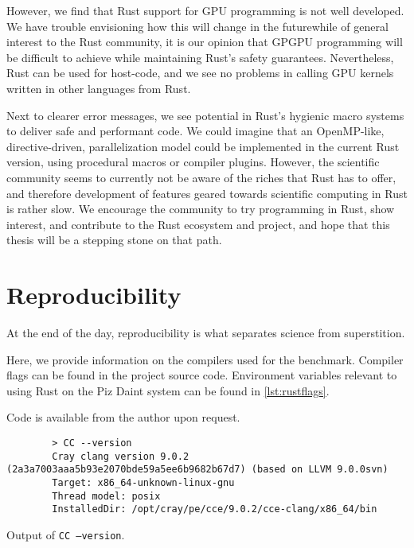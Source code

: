 \documentclass[british]{scrreprt}
\begin{document}
However, we find that Rust support for GPU programming is not well developed. We have trouble envisioning how this will change in the future\textemdash{}while of general interest to the Rust community, it is our opinion that GPGPU programming will be difficult to achieve while maintaining Rust's safety guarantees. Nevertheless, Rust can be used for host-code, and we see no problems in calling GPU kernels written in other languages from Rust.

Next to clearer error messages, we see potential in Rust's hygienic macro systems to deliver safe and performant code. We could imagine that an OpenMP-like, directive-driven, parallelization model could be implemented in the current Rust version, using procedural macros or compiler plugins. However, the scientific community seems to currently not be aware of the riches that Rust has to offer, and therefore development of features geared towards scientific computing in Rust is rather slow. We encourage the community to try programming in Rust, show interest, and contribute to the Rust ecosystem and project, and hope that this thesis will be a stepping stone on that path.

\appendix
\chapter{Reproducibility}
\label{app:reproducibility}
\begin{displayquote}
	At the end of the day, reproducibility is what separates science from superstition.
\end{displayquote}

Here, we provide information on the compilers used for the benchmark. Compiler flags can be found in the project source code. Environment variables relevant to using Rust on the Piz Daint system can be found in \cref{lst:rustflags}.

Code is available from the author upon request.

\begin{listing}
	\centering
	\begin{verbatim}
		> CC --version
		Cray clang version 9.0.2 (2a3a7003aaa5b93e2070bde59a5ee6b9682b67d7) (based on LLVM 9.0.0svn)
		Target: x86_64-unknown-linux-gnu
		Thread model: posix
		InstalledDir: /opt/cray/pe/cce/9.0.2/cce-clang/x86_64/bin
	\end{verbatim}
	\caption{Output of \texttt{CC --version}.}
\end{listing}
\end{document}
